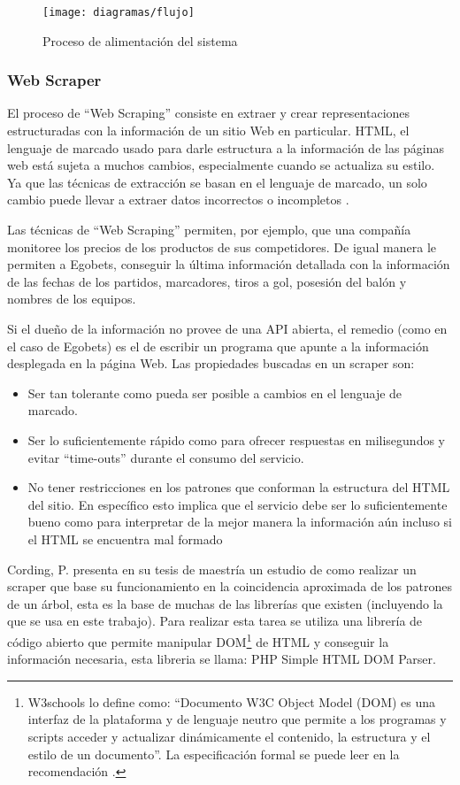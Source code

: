 \begin{figure}[!htb]\centering
   \begin {minipage}{1\textwidth}
     \texttt{[image: diagramas/flujo]}
     \caption{Proceso de alimentación del sistema}\label{Fig:flujo}
   \end{minipage}
\end{figure}

\subsubsection{Web Scraper}
El proceso de ``Web Scraping'' consiste en extraer y crear representaciones estructuradas con la información de un sitio Web en particular. HTML, el lenguaje de marcado usado para darle estructura a la información de las páginas web está sujeta a muchos cambios, especialmente cuando se actualiza su estilo. Ya que las técnicas de extracción se basan en el lenguaje de marcado, un solo cambio puede llevar a extraer datos incorrectos o incompletos \cite{cording2011algorithms}.

Las técnicas de ``Web Scraping'' permiten, por ejemplo, que una compañía monitoree los precios de los productos de sus competidores. De igual manera le permiten a Egobets, conseguir la última información detallada con la información de las fechas de los partidos, marcadores, tiros a gol, posesión del balón y nombres de los equipos.

Si el dueño de la información no provee de una API abierta, el remedio (como en el caso de Egobets) es el de escribir un programa que apunte a la información desplegada en la página Web. Las propiedades buscadas en un scraper son:
\begin{itemize}
	\item Ser tan tolerante como pueda ser posible a cambios en el lenguaje de marcado.
	\item Ser lo suficientemente rápido como para ofrecer respuestas en milisegundos y evitar ``time-outs'' durante el consumo del servicio.
	\item No tener restricciones en los patrones que conforman la estructura del HTML del sitio. En específico esto implica que el servicio debe ser lo suficientemente bueno como para interpretar de la mejor manera la información aún incluso si el HTML se encuentra mal formado
\end{itemize}

Cording, P. \cite{cording2011algorithms} presenta en su tesis de maestría un estudio de como realizar un scraper que base su funcionamiento en la coincidencia aproximada de los patrones de un árbol, esta es la base de muchas de las librerías que existen (incluyendo la que se usa en este trabajo). Para realizar esta tarea se utiliza una librería de código abierto que permite manipular DOM\footnote{W3schools \cite{domWeb} lo define como: ``Documento W3C Object Model (DOM) es una interfaz de la plataforma y de lenguaje neutro que permite a los programas y scripts acceder y actualizar dinámicamente el contenido, la estructura y el estilo de un documento''. La especificación formal se puede leer en la recomendación \cite{wood1998document}.} de HTML y conseguir la información necesaria, esta libreria se llama: PHP Simple HTML DOM Parser.

